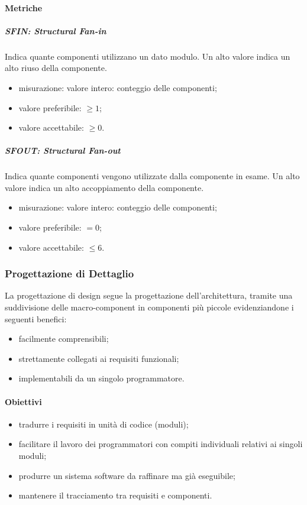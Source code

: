 	\paragraph{Metriche}
	\subparagraph{SFIN: Structural Fan-in}
	Indica quante componenti utilizzano un dato modulo. Un alto valore indica un alto riuso della componente.
	\begin{itemize}
		\item misurazione: valore intero: conteggio delle componenti;
		\item valore preferibile: $ \geq 1$;
		\item valore accettabile: $ \geq 0$.
	\end{itemize}
	\subparagraph{SFOUT: Structural Fan-out}
	Indica quante componenti vengono utilizzate dalla componente in esame. Un alto valore indica un alto
	accoppiamento della componente.
	\begin{itemize}
		\item misurazione: valore intero: conteggio delle componenti;
		\item valore preferibile: $ = 0$;
		\item valore accettabile: $ \leq 6$.
	\end{itemize}
	
			
	\subsubsection{Progettazione di Dettaglio}
	La progettazione di design segue la progettazione dell'architettura, tramite una suddivisione delle macro-component in componenti più piccole evidenziandone i seguenti benefici:
	\begin{itemize}
		\item facilmente comprensibili;
		\item strettamente collegati ai requisiti funzionali;
		\item implementabili da un singolo programmatore.
	\end{itemize}
		\paragraph{Obiettivi}
		\begin{itemize}
			\item tradurre i requisiti in unità di codice (moduli);
			\item facilitare il lavoro dei programmatori con compiti individuali relativi ai singoli moduli;
			\item produrre un sistema software da raffinare ma già eseguibile;
			\item mantenere il tracciamento tra requisiti e componenti.
		\end{itemize}
